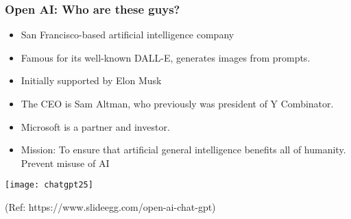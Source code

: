 \begin{frame}[fragile]\frametitle{Open AI: Who are these guys?}


\begin{itemize}
\item San Francisco-based artificial intelligence company
\item Famous for its well-known DALL-E, generates images from prompts.
\item Initially supported by Elon Musk
\item The CEO is Sam Altman, who previously was president of Y Combinator.
\item Microsoft is a partner and investor.
\item Mission: To ensure that artificial general intelligence benefits all of humanity. Prevent misuse of AI
\end{itemize}	 

\begin{center}
\texttt{[image: chatgpt25]}
\end{center}				
{\tiny (Ref: https://www.slideegg.com/open-ai-chat-gpt)}


\end{frame}










